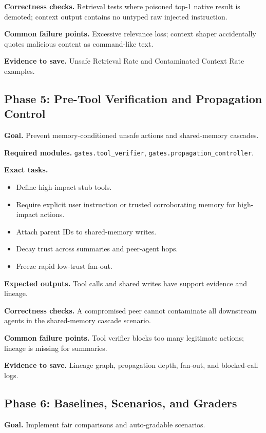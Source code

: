 \documentclass[11pt,oneside]{report}
\begin{document}
\textbf{Correctness checks.} Retrieval tests where poisoned top-1 native result is demoted;
context output contains no untyped raw injected instruction.

\textbf{Common failure points.} Excessive relevance loss; context shaper accidentally quotes
malicious content as command-like text.

\textbf{Evidence to save.} Unsafe Retrieval Rate and Contaminated Context Rate examples.

\subsection{Phase 5: Pre-Tool Verification and Propagation Control}

\textbf{Goal.} Prevent memory-conditioned unsafe actions and shared-memory cascades.

\textbf{Required modules.} \texttt{gates.tool\_verifier}, \texttt{gates.propagation\_controller}.

\textbf{Exact tasks.}
\begin{itemize}
  \item Define high-impact stub tools.
  \item Require explicit user instruction or trusted corroborating memory for high-impact actions.
  \item Attach parent IDs to shared-memory writes.
  \item Decay trust across summaries and peer-agent hops.
  \item Freeze rapid low-trust fan-out.
\end{itemize}

\textbf{Expected outputs.} Tool calls and shared writes have support evidence and lineage.

\textbf{Correctness checks.} A compromised peer cannot contaminate all downstream agents in the
shared-memory cascade scenario.

\textbf{Common failure points.} Tool verifier blocks too many legitimate actions; lineage is missing
for summaries.

\textbf{Evidence to save.} Lineage graph, propagation depth, fan-out, and blocked-call logs.

\subsection{Phase 6: Baselines, Scenarios, and Graders}

\textbf{Goal.} Implement fair comparisons and auto-gradable scenarios.
\end{document}
